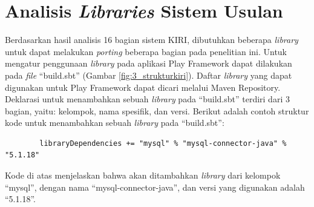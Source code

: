 \section{Analisis \textit{Libraries} Sistem Usulan}
\label{sec:analisislibrary}
Berdasarkan hasil analisis 16 bagian sistem KIRI, dibutuhkan beberapa \textit{library} untuk dapat melakukan \textit{porting} beberapa bagian pada penelitian ini. Untuk mengatur penggunaan \textit{library} pada aplikasi Play Framework dapat dilakukan pada \textit{file} ``build.sbt''\cite{playframeworkweb} (Gambar \ref{fig:3_strukturkiri}). Daftar \textit{library} yang dapat digunakan untuk Play Framework dapat dicari melalui Maven Repository\cite{maven}. Deklarasi untuk menambahkan sebuah \textit{library} pada ``build.sbt'' terdiri dari 3 bagian, yaitu: kelompok, nama spesifik, dan versi. Berikut adalah contoh struktur kode untuk menambahkan sebuah \textit{library} pada ``build.sbt'':
\begin{lstlisting}
		libraryDependencies += "mysql" % "mysql-connector-java" % "5.1.18"
\end{lstlisting}
Kode di atas menjelaskan bahwa akan ditambahkan \textit{library} dari kelompok ``mysql'', dengan nama ``mysql-connector-java'', dan versi yang digunakan adalah ``5.1.18''.

